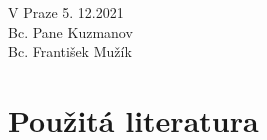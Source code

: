 \documentclass[a4paper, 12pt, oneside, titlepage]{article} %
\begin{document}
\begin{flushright}
V Praze 5. 12.2021\\
\vspace{2mm}
Bc. Pane Kuzmanov\\
Bc. František Mužík\\
\end{flushright}


\clearpage 
\section*{Použitá literatura}
\renewcommand{\section}[2]{}%


\end{document}
